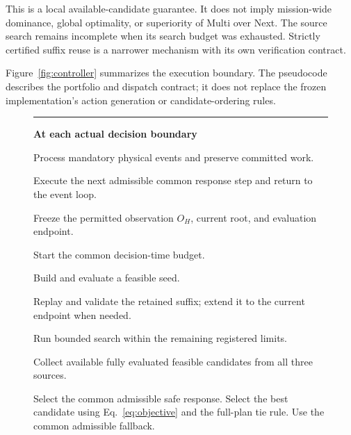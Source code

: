 \documentclass[conference]{IEEEtran}
\begin{document}
This is a local available-candidate guarantee.
It does not imply mission-wide dominance, global optimality,
or superiority of Multi over Next.
The source search remains incomplete when its search budget
was exhausted.
Strictly certified suffix reuse is a narrower mechanism with
its own verification contract.

Figure~\ref{fig:controller} summarizes the execution boundary.
The pseudocode describes the portfolio and dispatch contract;
it does not replace the frozen implementation's action
generation or candidate-ordering rules.

\begin{figure}[!t]
    \centering
    \begin{minipage}{0.98\columnwidth}
        \hrule
        \vspace{4pt}
        \footnotesize

        \textbf{At each actual decision boundary}

        \begin{algorithmic}[1]
            \STATE Process mandatory physical events and
                   preserve committed work.

                \STATE Execute the next admissible common
                       response step and return to the event loop.
            \ENDIF

            \STATE Freeze the permitted observation $O_H$,
                   current root, and evaluation endpoint.

            \STATE Start the common decision-time budget.

            \STATE Build and evaluate a feasible seed.

            \STATE Replay and validate the retained suffix;
                   extend it to the current endpoint when needed.

            \STATE Run bounded search within the remaining
                   registered limits.

            \STATE Collect available fully evaluated feasible
                   candidates from all three sources.

                \STATE Select the common admissible safe response.
                \STATE Select the best candidate using
                       Eq.~\eqref{eq:objective} and the full-plan
                       tie rule.
            \ELSE
                \STATE Use the common admissible fallback.
            \ENDIF


\end{algorithmic}
\end{minipage}
\end{figure}
\end{document}
